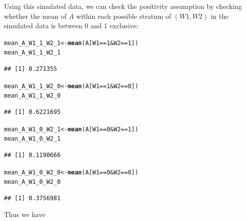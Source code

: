 \documentclass{article}\usepackage[]{graphicx}\usepackage[]{xcolor}
\makeatletter
\newcommand{\hlnum}[1]{\textcolor[rgb]{0.686,0.059,0.569}{#1}}%
\newcommand{\hlopt}[1]{\textcolor[rgb]{0,0,0}{#1}}%
\newcommand{\hlstd}[1]{\textcolor[rgb]{0.345,0.345,0.345}{#1}}%
\newcommand{\hlkwb}[1]{\textcolor[rgb]{0.69,0.353,0.396}{#1}}%
\newcommand{\hlkwd}[1]{\textcolor[rgb]{0.737,0.353,0.396}{\textbf{#1}}}%
\newenvironment{kframe}{%
 \def\at@end@of@kframe{}%
 \ifinner\ifhmode%
  \def\at@end@of@kframe{\end{minipage}}%
  \begin{minipage}{\columnwidth}%
 \fi\fi%
 \def\FrameCommand##1{\hskip\@totalleftmargin \hskip-\fboxsep
 \colorbox{shadecolor}{##1}\hskip-\fboxsep
     \hskip-\linewidth \hskip-\@totalleftmargin \hskip\columnwidth}%
 \MakeFramed {\advance\hsize-\width
   \@totalleftmargin\z@ \linewidth\hsize
   \@setminipage}}%
 {\par\unskip\endMakeFramed%
 \at@end@of@kframe}
\newenvironment{knitrout}{}{} %
\makeatother
\begin{document}
Using this simulated data, we can check the positivity assumption by checking whether the mean of $A$ within each possible stratum of $(W1, W2)$ in the simulated data is between 0 and 1 exclusive:
  
\begin{knitrout}
\color{fgcolor}\begin{kframe}
\begin{alltt}
\hlstd{mean_A_W1_1_W2_1} \hlkwb{<-} \hlkwd{mean}\hlstd{(A[W1} \hlopt{==} \hlnum{1} \hlopt{&} \hlstd{W2} \hlopt{==} \hlnum{1}\hlstd{])}
\hlstd{mean_A_W1_1_W2_1}
\end{alltt}
\begin{verbatim}
## [1] 0.271355
\end{verbatim}
\begin{alltt}
\hlstd{mean_A_W1_1_W2_0} \hlkwb{<-} \hlkwd{mean}\hlstd{(A[W1} \hlopt{==} \hlnum{1} \hlopt{&} \hlstd{W2} \hlopt{==} \hlnum{0}\hlstd{])}
\hlstd{mean_A_W1_1_W2_0}
\end{alltt}
\begin{verbatim}
## [1] 0.6221695
\end{verbatim}
\begin{alltt}
\hlstd{mean_A_W1_0_W2_1} \hlkwb{<-} \hlkwd{mean}\hlstd{(A[W1} \hlopt{==} \hlnum{0} \hlopt{&} \hlstd{W2} \hlopt{==} \hlnum{1}\hlstd{])}
\hlstd{mean_A_W1_0_W2_1}
\end{alltt}
\begin{verbatim}
## [1] 0.1190666
\end{verbatim}
\begin{alltt}
\hlstd{mean_A_W1_0_W2_0} \hlkwb{<-} \hlkwd{mean}\hlstd{(A[W1} \hlopt{==} \hlnum{0} \hlopt{&} \hlstd{W2} \hlopt{==} \hlnum{0}\hlstd{])}
\hlstd{mean_A_W1_0_W2_0}
\end{alltt}
\begin{verbatim}
## [1] 0.3756981
\end{verbatim}
\end{kframe}
\end{knitrout}


Thus we have 
\end{document}
